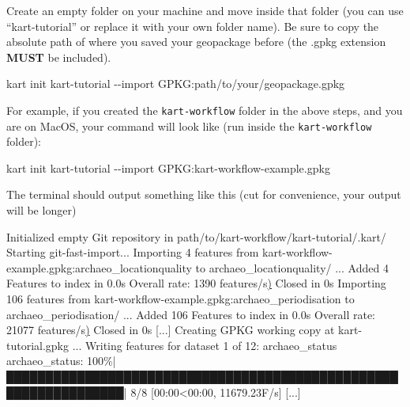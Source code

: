 \documentclass[
  letterpaper,
  DIV=11,
  numbers=noendperiod]{scrartcl}
\newenvironment{Shaded}{\begin{snugshade}}{\end{snugshade}}
\newcommand{\AttributeTok}[1]{\textcolor[rgb]{1.00,0.47,0.78}{#1}}
\newcommand{\ErrorTok}[1]{\textcolor[rgb]{1.00,0.33,0.33}{\underline{#1}}}
\newcommand{\ExtensionTok}[1]{\textcolor[rgb]{0.55,0.91,0.99}{#1}}
\newcommand{\KeywordTok}[1]{\textcolor[rgb]{1.00,0.47,0.78}{#1}}
\newcommand{\NormalTok}[1]{\textcolor[rgb]{0.97,0.97,0.95}{#1}}
\newcommand{\OperatorTok}[1]{\textcolor[rgb]{0.97,0.97,0.95}{#1}}
\begin{document}
Create an empty folder on your machine and move inside that folder (you
can use ``kart-tutorial'' or replace it with your own folder name). Be
sure to copy the absolute path of where you saved your geopackage before
(the .gpkg extension \textbf{MUST} be included).

\begin{Shaded}
\begin{Highlighting}[]
\ExtensionTok{kart}\NormalTok{ init kart{-}tutorial }\AttributeTok{{-}{-}import}\NormalTok{ GPKG:path/to/your/geopackage.gpkg}
\end{Highlighting}
\end{Shaded}

For example, if you created the \texttt{kart-workflow} folder in the
above steps, and you are on MacOS, your command will look like (run
inside the \texttt{kart-workflow} folder):

\begin{Shaded}
\begin{Highlighting}[]
\ExtensionTok{kart}\NormalTok{ init kart{-}tutorial }\AttributeTok{{-}{-}import}\NormalTok{ GPKG:kart{-}workflow{-}example.gpkg}
\end{Highlighting}
\end{Shaded}

The terminal should output something like this (cut for convenience,
your output will be longer)

\begin{Shaded}
\begin{Highlighting}[]
\ExtensionTok{Initialized}\NormalTok{ empty Git repository in path/to/kart{-}workflow/kart{-}tutorial/.kart/}
\ExtensionTok{Starting}\NormalTok{ git{-}fast{-}import...}
\ExtensionTok{Importing}\NormalTok{ 4 features from kart{-}workflow{-}example.gpkg:archaeo\_locationquality to archaeo\_locationquality/ ...}
\ExtensionTok{Added}\NormalTok{ 4 Features to index in 0.0s}
\ExtensionTok{Overall}\NormalTok{ rate: 1390 features/s}\ErrorTok{)}
\ExtensionTok{Closed}\NormalTok{ in 0s}
\ExtensionTok{Importing}\NormalTok{ 106 features from kart{-}workflow{-}example.gpkg:archaeo\_periodisation to archaeo\_periodisation/ ...}
\ExtensionTok{Added}\NormalTok{ 106 Features to index in 0.0s}
\ExtensionTok{Overall}\NormalTok{ rate: 21077 features/s}\ErrorTok{)}
\ExtensionTok{Closed}\NormalTok{ in 0s}
\ExtensionTok{[...]}
\ExtensionTok{Creating}\NormalTok{ GPKG working copy at kart{-}tutorial.gpkg ...}
\ExtensionTok{Writing}\NormalTok{ features for dataset 1 of 12: archaeo\_status}
\ExtensionTok{archaeo\_status:}\NormalTok{ 100\%}\KeywordTok{|}\ExtensionTok{█████████████████████████████████████████████████████████████████}\KeywordTok{|} \ExtensionTok{8/8}\NormalTok{ [00:00}\OperatorTok{\textless{}}\NormalTok{00:00, 11679.23F/s]}
\ExtensionTok{[...]}
\end{Highlighting}
\end{Shaded}
\end{document}
